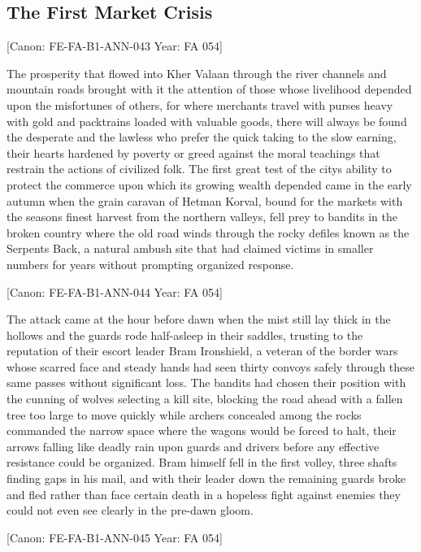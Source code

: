\subsection{The First Market Crisis}\label{the-first-market-crisis}

{[}Canon: FE-FA-B1-ANN-043 \textbar{} Year: FA 054{]}

The prosperity that flowed into Kher Valaan through the river channels
and mountain roads brought with it the attention of those whose
livelihood depended upon the misfortunes of others, for where merchants
travel with purses heavy with gold and packtrains loaded with valuable
goods, there will always be found the desperate and the lawless who
prefer the quick taking to the slow earning, their hearts hardened by
poverty or greed against the moral teachings that restrain the actions
of civilized folk. The first great test of the city\textquotesingle s
ability to protect the commerce upon which its growing wealth depended
came in the early autumn when the grain caravan of Hetman Korval, bound
for the markets with the season\textquotesingle s finest harvest from
the northern valleys, fell prey to bandits in the broken country where
the old road winds through the rocky defiles known as the
Serpent\textquotesingle s Back, a natural ambush site that had claimed
victims in smaller numbers for years without prompting organized
response.

{[}Canon: FE-FA-B1-ANN-044 \textbar{} Year: FA 054{]}

The attack came at the hour before dawn when the mist still lay thick in
the hollows and the guards rode half-asleep in their saddles, trusting
to the reputation of their escort leader Bram Ironshield, a veteran of
the border wars whose scarred face and steady hands had seen thirty
convoys safely through these same passes without significant loss. The
bandits had chosen their position with the cunning of wolves selecting a
kill site, blocking the road ahead with a fallen tree too large to move
quickly while archers concealed among the rocks commanded the narrow
space where the wagons would be forced to halt, their arrows falling
like deadly rain upon guards and drivers before any effective resistance
could be organized. Bram himself fell in the first volley, three shafts
finding gaps in his mail, and with their leader down the remaining
guards broke and fled rather than face certain death in a hopeless fight
against enemies they could not even see clearly in the pre-dawn gloom.

{[}Canon: FE-FA-B1-ANN-045 \textbar{} Year: FA 054{]}

